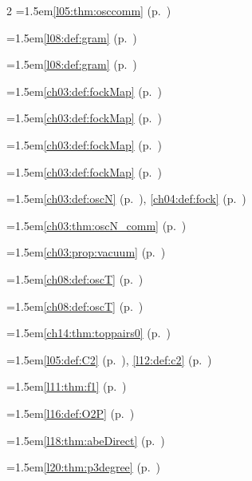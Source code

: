 \begin{multicols}{2}
\hangindent=1.5em\quad \ref{l05:thm:osccomm} (p.~\pageref{l05:thm:osccomm})\par
\hangindent=1.5em\quad \ref{l08:def:gram} (p.~\pageref{l08:def:gram})\par
\hangindent=1.5em\quad \ref{l08:def:gram} (p.~\pageref{l08:def:gram})\par
\hangindent=1.5em\quad \ref{ch03:def:fockMap} (p.~\pageref{ch03:def:fockMap})\par
\hangindent=1.5em\quad \ref{ch03:def:fockMap} (p.~\pageref{ch03:def:fockMap})\par
\hangindent=1.5em\quad \ref{ch03:def:fockMap} (p.~\pageref{ch03:def:fockMap})\par
\hangindent=1.5em\quad \ref{ch03:def:fockMap} (p.~\pageref{ch03:def:fockMap})\par
\hangindent=1.5em\quad \ref{ch03:def:oscN} (p.~\pageref{ch03:def:oscN}), \ref{ch04:def:fock} (p.~\pageref{ch04:def:fock})\par
\hangindent=1.5em\quad \ref{ch03:thm:oscN_comm} (p.~\pageref{ch03:thm:oscN_comm})\par
\hangindent=1.5em\quad \ref{ch03:prop:vacuum} (p.~\pageref{ch03:prop:vacuum})\par
\hangindent=1.5em\quad \ref{ch08:def:oscT} (p.~\pageref{ch08:def:oscT})\par
\hangindent=1.5em\quad \ref{ch08:def:oscT} (p.~\pageref{ch08:def:oscT})\par
\hangindent=1.5em\quad \ref{ch14:thm:toppairs0} (p.~\pageref{ch14:thm:toppairs0})\par
\hangindent=1.5em\quad \ref{l05:def:C2} (p.~\pageref{l05:def:C2}), \ref{l12:def:c2} (p.~\pageref{l12:def:c2})\par
\hangindent=1.5em\quad \ref{l11:thm:f1} (p.~\pageref{l11:thm:f1})\par
\hangindent=1.5em\quad \ref{l16:def:O2P} (p.~\pageref{l16:def:O2P})\par
\hangindent=1.5em\quad \ref{l18:thm:abeDirect} (p.~\pageref{l18:thm:abeDirect})\par
\par{}\par\nopagebreak\smallskip
\hangindent=1.5em\quad \ref{l20:thm:p3degree} (p.~\pageref{l20:thm:p3degree})\par

\end{multicols}
